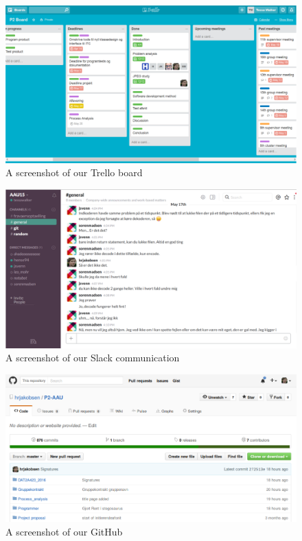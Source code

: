\begin{figure}
	\centering
	\includegraphics[width=1 \textwidth]{figures/trello.png}
	\caption{A screenshot of our Trello board}
	\label{fig:trello}
\end{figure}

\begin{figure}
	\centering
	\includegraphics[width=1 \textwidth]{figures/slack.png}
	\caption{A screenshot of our Slack communication}
	\label{fig:slack}
\end{figure}

\begin{figure}
	\centering
	\includegraphics[width=1 \textwidth]{figures/git.png}
	\caption{A screenshot of our GitHub}
	\label{fig:git}
\end{figure}

